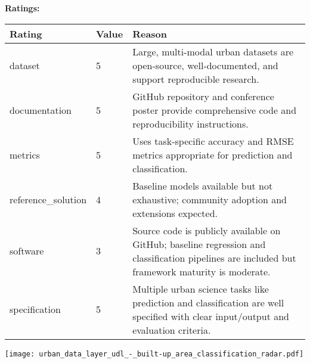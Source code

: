 {{{\bf Ratings:} ~ \\

\begin{tabular}{p{} p{} p{}}
\hline
Rating & Value & Reason \\
\hline
dataset & 5 & Large, multi-modal urban datasets are open-source, well-documented, and support
reproducible research.
 \\
documentation & 5 & GitHub repository and conference poster provide comprehensive code and reproducibility
instructions.
 \\
metrics & 5 & Uses task-specific accuracy and RMSE metrics appropriate for prediction and classification.
 \\
reference\_solution & 4 & Baseline models available but not exhaustive; community adoption and extensions expected.
 \\
software & 3 & Source code is publicly available on GitHub; baseline regression and classification
pipelines are included but framework maturity is moderate.
 \\
specification & 5 & Multiple urban science tasks like prediction and classification are well specified
with clear input/output and evaluation criteria.
 \\
\hline
\end{tabular}

\texttt{[image: urban\_data\_layer\_udl\_-\_built-up\_area\_classification\_radar.pdf]}
}}
\clearpage